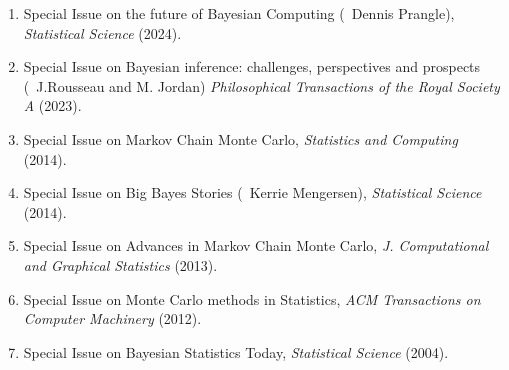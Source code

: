 \bigskip
		\centerline{\sc \aedit}

\medskip
\begin{enumerate}
\renewcommand{\theenumi}{[\AE-\arabic{enumi}]}
\item Special Issue on the future of Bayesian Computing (\avec\ Dennis Prangle), {\it Statistical Science} (2024).
\item Special Issue on Bayesian inference: challenges, perspectives and prospects (\avec~J.Rousseau and M. Jordan) {\em Philosophical Transactions of the Royal Society A} (2023).
\item Special Issue on Markov Chain Monte Carlo, {\it Statistics and Computing} (2014).
\item Special Issue on Big Bayes Stories (\avec\ Kerrie Mengersen), {\it Statistical Science} (2014).
\item Special Issue on Advances in Markov Chain Monte Carlo, {\em J. Computational and Graphical 
Statistics} (2013).
\item Special Issue on Monte Carlo methods in Statistics, {\it ACM Transactions on Computer Machinery} (2012).
\item Special Issue on Bayesian Statistics Today, {\it Statistical Science} (2004).
\end{enumerate}

\bigskip
		\centerline{\sc \publi}

